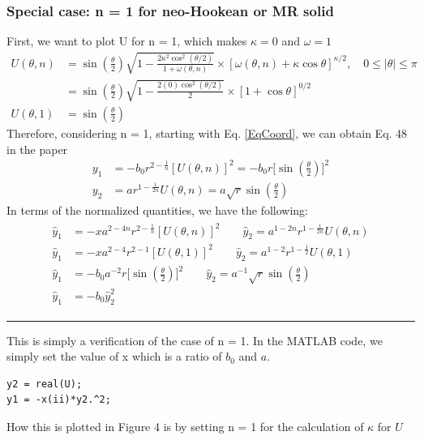 \documentclass[12pt,3p]{article}
\numberwithin{equation}{section}
\begin{document}
\subsubsection{Special case: n = 1 for neo-Hookean or MR solid}
First, we want to plot U for n = 1, which makes $\kappa = 0$ and $\omega = 1$
\begin{align*}
U (\theta, n) &= \sin (\frac{\theta}{2}) \sqrt{1-\frac{2 \kappa^{2} \cos ^{2}(\theta / 2)}{1+\omega(\theta, n)}} \times[\omega(\theta, n) + \kappa \cos \theta]^{\kappa / 2}, \quad 0 \leq|\theta| \leq \pi \\
		&= \sin (\frac{\theta}{2}) \sqrt{1-\frac{2 (0) \cos ^{2}(\theta / 2)}{2}} \times[ 1 + \cos \theta]^{0/2} \\ 
U (\theta, 1) &= \sin (\frac{\theta}{2}) 
\end{align*}
Therefore, considering n = 1, starting with Eq. \ref{EqCoord}, we can obtain Eq. 48 in the paper
\begin{align*}
y_1 &= -b_{0} r^{2-\frac{1}{n}} [U(\theta, n)]^{2} = -b_{0} r \bigg[\sin (\frac{\theta}{2}) \bigg]^2 \\ 
y_2 &= a r^{1 - \frac{1}{2n}} U (\theta, n) = a \sqrt{r} \sin (\frac{\theta}{2}) 
\end{align*}
In terms of the normalized quantities, we have the following: 
\begin{align}
\begin{split}
\hat{y}_1 &= - x a^{2-4n} r^{2-\frac{1}{n}}[U(\theta, n)]^{2} \quad \quad \hat{y}_2 = a^{1-2n} r^{1 - \frac{1}{2n}} U (\theta, n) \\
\hat{y}_1 &= - x a^{2-4} r^{2-1}[U(\theta, 1)]^{2} \quad \quad \hat{y}_2 = a^{1-2} r^{1 - \frac{1}{2}} U (\theta, 1) \\
\hat{y}_1 &= - b_0 a^{-2} r \bigg[\sin (\frac{\theta}{2}) \bigg]^{2} \quad \quad \hat{y}_2 = a^{-1} \sqrt{r} \sin (\frac{\theta}{2}) \\
\hat{y}_1 &= - b_0 \hat{y}_2^2
\end{split}
\end{align}
\noindent\rule{\linewidth}{0.5pt} %
This is simply a verification of the case of n = 1. In the MATLAB code, we simply set the value of x which is a ratio of $b_0$ and $a$. 
\begin{lstlisting}
y2 = real(U); 
y1 = -x(ii)*y2.^2;
\end{lstlisting}
How this is plotted in Figure 4 is by setting n = 1 for the calculation of $\kappa$ for $U$
\end{document}
